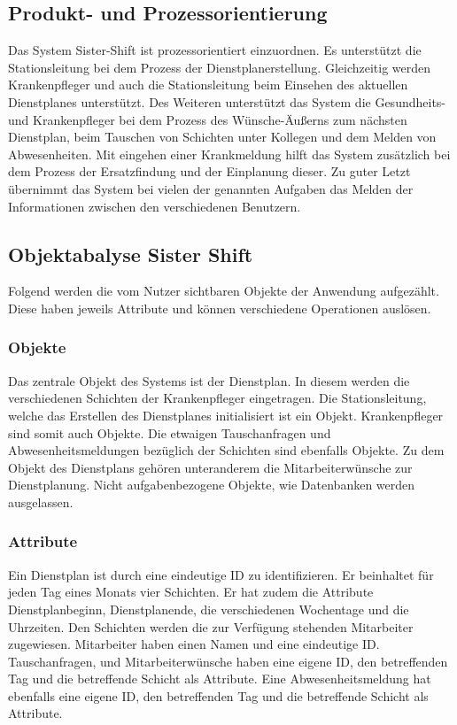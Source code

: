 \documentclass[11pt,
paper=a4,
bibtotocnumbered,	  %
liststotocnumbered,  %
DIV=calc,		  %
tablecaptionabove,	  %
headinclude,
]{article}
\begin{document}
\subsection{Produkt- und Prozessorientierung}
Das System Sister-Shift ist prozessorientiert einzuordnen. Es unterstützt die Stationsleitung bei dem Prozess der Dienstplanerstellung. Gleichzeitig werden Krankenpfleger und auch die Stationsleitung beim Einsehen des aktuellen Dienstplanes unterstützt. Des Weiteren unterstützt das System die Gesundheits- und Krankenpfleger bei dem Prozess des Wünsche-Äußerns zum nächsten Dienstplan, beim Tauschen von Schichten unter Kollegen und dem Melden von Abwesenheiten. Mit eingehen einer Krankmeldung hilft das System zusätzlich bei dem Prozess der Ersatzfindung und der Einplanung dieser. Zu guter Letzt übernimmt das System bei vielen der genannten Aufgaben das Melden der Informationen zwischen den verschiedenen Benutzern.
\subsection{Objektabalyse Sister Shift}
Folgend werden die vom Nutzer sichtbaren Objekte der Anwendung aufgezählt. Diese haben jeweils Attribute und können verschiedene Operationen auslösen.
\subsubsection{Objekte}
Das zentrale Objekt des Systems ist der Dienstplan. In diesem werden die verschiedenen Schichten der Krankenpfleger eingetragen. Die Stationsleitung, welche das Erstellen des Dienstplanes initialisiert ist ein Objekt. Krankenpfleger sind somit auch Objekte. Die etwaigen Tauschanfragen und Abwesenheitsmeldungen bezüglich der Schichten sind ebenfalls Objekte. Zu dem Objekt des Dienstplans gehören unteranderem die Mitarbeiterwünsche zur Dienstplanung. Nicht aufgabenbezogene Objekte, wie Datenbanken werden ausgelassen. 
\subsubsection{Attribute}
Ein Dienstplan ist durch eine eindeutige ID zu identifizieren. Er beinhaltet für jeden Tag eines Monats vier Schichten. Er hat zudem die Attribute Dienstplanbeginn, Dienstplanende, die verschiedenen Wochentage und die Uhrzeiten. Den Schichten werden die zur Verfügung stehenden Mitarbeiter zugewiesen. Mitarbeiter haben einen Namen und eine eindeutige ID. Tauschanfragen, und Mitarbeiterwünsche haben eine eigene ID, den betreffenden Tag und die betreffende Schicht als Attribute. Eine Abwesenheitsmeldung hat ebenfalls eine eigene ID, den betreffenden Tag und die betreffende Schicht als Attribute.
\end{document}
